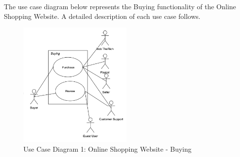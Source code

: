 \documentclass[11pt]{article}
\newcounter{use case ID}
\begin{document}
The use case diagram below represents the Buying functionality of the Online Shopping Website. A detailed description of each use case follows. 

\begin{figure}[htbp]
    \centering
    \includegraphics[width=0.5\textwidth]{ucd2.png}
    \caption{Use Case Diagram 1: Online Shopping Website - Buying }
    \label{fig:ucd2}
\end{figure}
\end{document}
